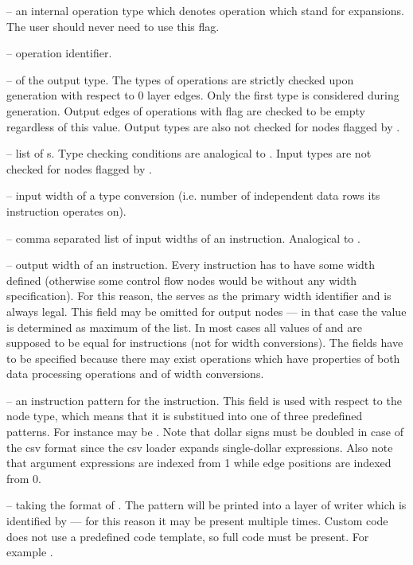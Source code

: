 \begin{description}
\begin{description}
    \item {} -- an internal operation type which denotes operation which stand for expansions. The user should never need to use this flag.
  \end{description}
  \item{} -- operation identifier.
  \item{} --  of the output type. The types of operations are strictly checked upon generation with respect to 0 layer edges. Only the first type is considered during generation. Output edges of operations with  flag are checked to be empty regardless of this value. Output types are also not checked for nodes flagged by .
  \item{} -- list of s. Type checking conditions are analogical to . Input types are not checked for nodes flagged by .
\item{} -- input width of a type conversion (i.e. number of independent data rows its instruction operates on).
\item{} -- comma separated list of input widths of an instruction. Analogical to .
\item{} -- output width of an instruction. Every instruction has to have some width defined (otherwise some control flow nodes would be without any width specification). For this reason, the  serves as the primary width identifier and is always legal. This field may be omitted for output nodes --- in that case the value is determined as maximum of the  list. In most cases all values of  and  are supposed to be equal for instructions (not for width conversions). The fields have to be specified because there may exist operations which have properties of both data processing operations and of width conversions.
  \item{} -- an instruction pattern for the instruction. This field is used with respect to the node type, which means that it is substitued into one of three predefined patterns. For instance  may be . Note that dollar signs must be doubled in case of the csv format since the csv loader expands single-dollar expressions. Also note that argument expressions are indexed from 1 while edge positions are indexed from 0.
  \item{} -- taking the format of  . The pattern will be printed into a layer of writer which is identified by  --- for this reason it may be present multiple times. Custom code does not use a predefined code template, so full code must be present. For example .
\end{description}

